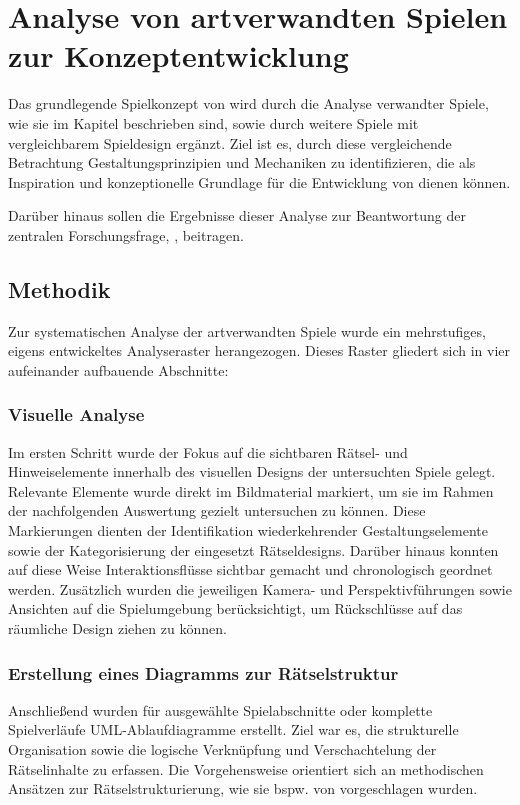 \chapter{Analyse von artverwandten Spielen zur Konzeptentwicklung}\label{sec:analysis}

Das grundlegende Spielkonzept von  wird durch die Analyse verwandter Spiele, wie sie im Kapitel \emph{} beschrieben sind, sowie durch weitere Spiele mit vergleichbarem Spieldesign ergänzt. Ziel ist es, durch diese vergleichende Betrachtung Gestaltungsprinzipien und Mechaniken zu identifizieren, die als Inspiration und konzeptionelle Grundlage für die Entwicklung von  dienen können.

Darüber hinaus sollen die Ergebnisse dieser Analyse zur Beantwortung der zentralen Forschungsfrage, \emph{}, beitragen.

\section{Methodik}
Zur systematischen Analyse der artverwandten Spiele wurde ein mehrstufiges, eigens entwickeltes Analyseraster herangezogen. Dieses Raster gliedert sich in vier aufeinander aufbauende Abschnitte:

\subsection{Visuelle Analyse}
Im ersten Schritt wurde der Fokus auf die sichtbaren Rätsel- und Hinweiselemente innerhalb des visuellen Designs der untersuchten Spiele gelegt. Relevante Elemente wurde direkt im Bildmaterial markiert, um sie im Rahmen der nachfolgenden Auswertung gezielt untersuchen zu können. Diese Markierungen dienten der Identifikation wiederkehrender Gestaltungselemente sowie der Kategorisierung der eingesetzt Rätseldesigns. Darüber hinaus konnten auf diese Weise Interaktionsflüsse sichtbar gemacht und chronologisch geordnet werden. Zusätzlich wurden die jeweiligen Kamera- und Perspektivführungen sowie Ansichten auf die Spielumgebung berücksichtigt, um Rückschlüsse auf das räumliche Design ziehen zu können.

\subsection{Erstellung eines Diagramms zur Rätselstruktur}
Anschließend wurden für ausgewählte Spielabschnitte oder komplette Spielverläufe UML-Ablaufdiagramme erstellt. Ziel war es, die strukturelle Organisation sowie die logische Verknüpfung und Verschachtelung der Rätselinhalte zu erfassen. Die Vorgehensweise orientiert sich an methodischen Ansätzen zur Rätselstrukturierung, wie sie bspw. von \cite{tim_schafer_grim_1996} vorgeschlagen wurden.

